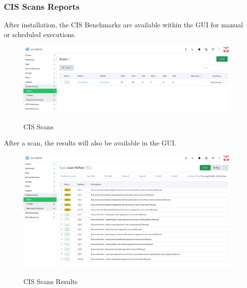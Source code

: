 \subsubsection{CIS Scans Reports}

After installation, the CIS Benchmarks are available within the GUI for manual or scheduled executions.

\begin{figure}[H]
\centering
\caption {CIS Scans}
\includegraphics[width=\linewidth]{images/cis-scans-1.png}
\label{fig:cisScans}
\end{figure}

After a scan, the results will also be available in the GUI.

\begin{figure}[H]
\centering
\caption {CIS Scans Results}
\includegraphics[width=\linewidth]{images/cis-scans-2.png}
\label{fig:cisResults}
\end{figure}
